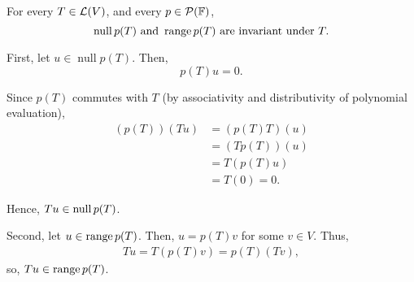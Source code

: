 \begin{thm}
  \label{thm: null space and range of p(T) are invariant under T}
  For every $T \in \mathcal{L}(V)$, and every $p \in \mathcal{P} (\mathbb{F})$,
  \begin{equation}
    \operatorname{null} p(T) \text{ and } \operatorname{range} p(T) \text{ are invariant under } T.
  \end{equation}
\end{thm}
\begin{prf}
  \StepOne First, let $u \in \operatorname{null} p(T)$. Then,
  \begin{equation}
    p(T)u = 0.
  \end{equation}

  Since $p(T)$ commutes with $T$ (by associativity and distributivity of polynomial evaluation),
  \begin{equation}
    \begin{aligned}
      (p(T))(Tu) &= (p(T)T)(u) \\
      &= (Tp(T))(u) \\
      &= T(p(T)u) \\
      &= T(0) = 0.
    \end{aligned}
  \end{equation}

  Hence, $Tu \in \operatorname{null} p(T)$.

  \StepTwo Second, let $u \in \operatorname{range} p(T)$. Then, $u = p(T)v$ for some $v \in V$. Thus,
  \begin{equation}
    \begin{aligned}
      Tu = T(p(T)v) = p(T)(Tv),
    \end{aligned}
  \end{equation}
  so, $Tu \in \operatorname{range} p(T)$.
\end{prf}
